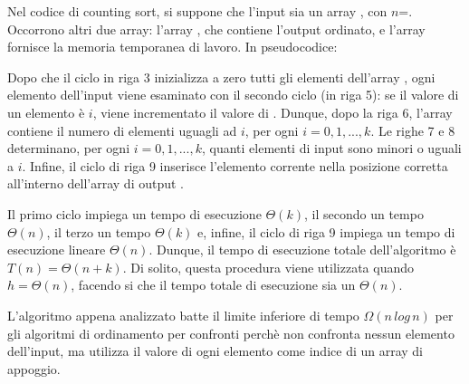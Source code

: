 Nel codice di counting sort, si suppone che l'input sia un array , con \(n\)=. Occorrono altri due array: l'array , che contiene l'output ordinato, e l'array  fornisce la memoria temporanea di lavoro. In pseudocodice:



Dopo che il ciclo  in riga 3 inizializza a zero tutti gli elementi dell'array , ogni elemento dell'input viene esaminato con il secondo ciclo  (in riga 5): se il valore di un elemento è \(i\), viene incrementato il valore di . Dunque, dopo la riga 6, l'array  contiene il numero di elementi uguagli ad \(i\), per ogni \(i=0,1,...,k\). Le righe 7 e 8 determinano, per ogni \(i=0,1,...,k\), quanti elementi di input sono minori o uguali a \(i\). Infine, il ciclo  di riga 9 inserisce l'elemento corrente nella posizione corretta all'interno dell'array di output . 

Il primo ciclo  impiega un tempo di esecuzione \(\Theta(k)\), il secondo un tempo \(\Theta(n)\), il terzo un tempo \(\Theta(k)\) e, infine, il ciclo  di riga 9 impiega un tempo di esecuzione lineare \(\Theta(n)\). Dunque, il tempo di esecuzione totale dell'algoritmo  è \(T(n)=\Theta(n+k)\). Di solito, questa procedura viene utilizzata quando \(h=\Theta(n)\), facendo si che il tempo totale di esecuzione sia un \(\Theta(n)\). 

L'algoritmo appena analizzato batte il limite inferiore di tempo \(\Omega(n\,log\,n)\) per gli algoritmi di ordinamento per confronti perchè non confronta nessun elemento dell'input, ma utilizza il valore di ogni elemento come indice di un array  di appoggio. 




